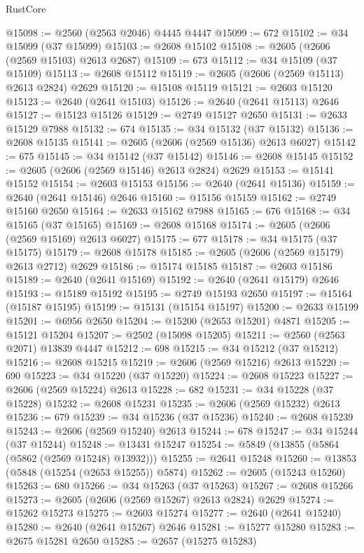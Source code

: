\begin{lexlean}{RustCore}
\begin{coremodule}
@15098 := @2560 (@2563 @2046) @4445 @4447
@15099 := 672
@15102 := @34 @15099 (@37 @15099)
@15103 := @2608 @15102
@15108 := @2605 (@2606 (@2569 @15103) @2613 @2687)
@15109 := 673
@15112 := @34 @15109 (@37 @15109)
@15113 := @2608 @15112
@15119 := @2605 (@2606 (@2569 @15113) @2613 @2824) @2629
@15120 := @15108 @15119
@15121 := @2603 @15120
@15123 := @2640 (@2641 @15103)
@15126 := @2640 (@2641 @15113) @2646
@15127 := @15123 @15126
@15129 := @2749 @15127 @2650
@15131 := @2633 @15129 @7988
@15132 := 674
@15135 := @34 @15132 (@37 @15132)
@15136 := @2608 @15135
@15141 := @2605 (@2606 (@2569 @15136) @2613 @6027)
@15142 := 675
@15145 := @34 @15142 (@37 @15142)
@15146 := @2608 @15145
@15152 := @2605 (@2606 (@2569 @15146) @2613 @2824) @2629
@15153 := @15141 @15152
@15154 := @2603 @15153
@15156 := @2640 (@2641 @15136)
@15159 := @2640 (@2641 @15146) @2646
@15160 := @15156 @15159
@15162 := @2749 @15160 @2650
@15164 := @2633 @15162 @7988
@15165 := 676
@15168 := @34 @15165 (@37 @15165)
@15169 := @2608 @15168
@15174 := @2605 (@2606 (@2569 @15169) @2613 @6027)
@15175 := 677
@15178 := @34 @15175 (@37 @15175)
@15179 := @2608 @15178
@15185 := @2605 (@2606 (@2569 @15179) @2613 @2712) @2629
@15186 := @15174 @15185
@15187 := @2603 @15186
@15189 := @2640 (@2641 @15169)
@15192 := @2640 (@2641 @15179) @2646
@15193 := @15189 @15192
@15195 := @2749 @15193 @2650
@15197 := @15164 (@15187 @15195)
@15199 := @15131 (@15154 @15197)
@15200 := @2633 @15199
@15201 := @6956 @2650
@15204 := @15200 (@2653 @15201) @4871
@15205 := @15121 @15204
@15207 := @2502 (@15098 @15205)
@15211 := @2560 (@2563 @2071) @13839 @4447
@15212 := 698
@15215 := @34 @15212 (@37 @15212)
@15216 := @2608 @15215
@15219 := @2606 (@2569 @15216) @2613
@15220 := 690
@15223 := @34 @15220 (@37 @15220)
@15224 := @2608 @15223
@15227 := @2606 (@2569 @15224) @2613
@15228 := 682
@15231 := @34 @15228 (@37 @15228)
@15232 := @2608 @15231
@15235 := @2606 (@2569 @15232) @2613
@15236 := 679
@15239 := @34 @15236 (@37 @15236)
@15240 := @2608 @15239
@15243 := @2606 (@2569 @15240) @2613
@15244 := 678
@15247 := @34 @15244 (@37 @15244)
@15248 := @13431 @15247
@15254 := @5849 (@13855 (@5864 (@5862 (@2569 @15248) @13932)))
@15255 := @2641 @15248
@15260 := @13853 (@5848 (@15254 (@2653 @15255)) @5874)
@15262 := @2605 (@15243 @15260)
@15263 := 680
@15266 := @34 @15263 (@37 @15263)
@15267 := @2608 @15266
@15273 := @2605 (@2606 (@2569 @15267) @2613 @2824) @2629
@15274 := @15262 @15273
@15275 := @2603 @15274
@15277 := @2640 (@2641 @15240)
@15280 := @2640 (@2641 @15267) @2646
@15281 := @15277 @15280
@15283 := @2675 @15281 @2650
@15285 := @2657 (@15275 @15283)

\end{coremodule}
\end{lexlean}
